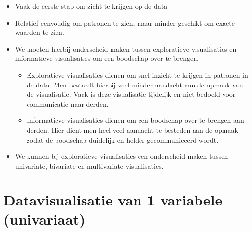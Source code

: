 \documentclass[]{memoir}
\providecommand{\tightlist}{%
  \setlength{\itemsep}{0pt}\setlength{\parskip}{0pt}}
\begin{document}
\begin{itemize}
\tightlist
\item
  Vaak de eerste stap om zicht te krijgen op de data.
\item
  Relatief eenvoudig om patronen te zien, maar minder geschikt om exacte
  waarden te zien.
\item
  We moeten hierbij onderscheid maken tussen exploratieve visualisaties
  en informatieve visualisaties om een boodschap over te brengen.

  \begin{itemize}
  \tightlist
  \item
    Exploratieve visualisaties dienen om snel inzicht te krijgen in
    patronen in de data. Men besteedt hierbij veel minder aandacht aan
    de opmaak van de visualisatie. Vaak is deze visualisatie tijdelijk
    en niet bedoeld voor communicatie naar derden.
  \item
    Informatieve visualisaties dienen om een boodschap over te brengen
    aan derden. Hier dient men heel veel aandacht te besteden aan de
    opmaak zodat de boodschap duidelijk en helder gecommuniceerd wordt.
  \end{itemize}
\item
  We kunnen bij exploratieve visualisaties een onderscheid maken tussen
  univariate, bivariate en multivariate visualisaties.
\end{itemize}

\section{Datavisualisatie van 1 variabele
(univariaat)}\label{datavisualisatie-van-1-variabele-univariaat}
\end{document}
